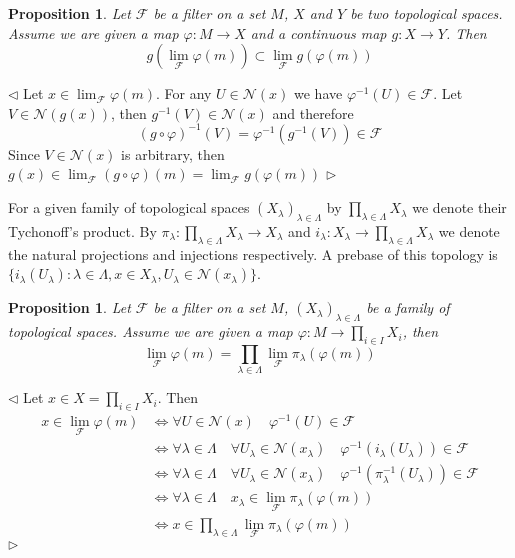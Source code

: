 \documentclass[12pt]{article}
\newtheorem{proposition}[theorem]{Proposition}
\newenvironment{proof}{\par $\triangleleft$}{$\triangleright$}
\begin{document}
\begin{proposition}\label{PrFiltersUnderContinuousFunctions} Let $\mathcal{F}$ be a filter on a set $M$, $X$ and $Y$ be two topological spaces. Assume we are given a map $\varphi:M\to X$ and a continuous map $g: X\to Y$. Then 
$$
g\left(\lim_{\mathcal{F}}\varphi(m)\right)\subset\lim_{\mathcal{F}}g(\varphi(m))
$$
\end{proposition}
\begin{proof} Let $x\in\lim_{\mathcal{F}}\varphi(m)$. For any $U\in\mathcal{N}(x)$ we have $\varphi^{-1}(U)\in\mathcal{F}$. Let $V\in\mathcal{N}(g(x))$, then $g^{-1}(V)\in\mathcal{N}(x)$ and therefore
$$
(g\circ\varphi)^{-1}(V)=\varphi^{-1}(g^{-1}(V))\in\mathcal{F}
$$
Since $V\in\mathcal{N}(x)$ is arbitrary, then $g(x)\in\lim_{\mathcal{F}}(g\circ\varphi)(m)=\lim_{\mathcal{F}}g(\varphi(m))$
\end{proof}

For a given family of topological spaces $(X_\lambda)_{\lambda\in \Lambda}$ by $\prod_{\lambda\in \Lambda}X_\lambda$ we denote their Tychonoff's product. By $\pi_\lambda:\prod_{\lambda\in \Lambda}X_\lambda\to X_\lambda$ and $i_\lambda:X_\lambda\to \prod_{\lambda\in \Lambda}X_\lambda$ we denote the natural projections and injections respectively. A prebase of this topology is $\{i_{\lambda}(U_\lambda):\lambda\in\Lambda, x\in X_\lambda, U_\lambda\in \mathcal{N}(x_\lambda)\}$.

\begin{proposition}\label{PrTopProdAndFilters}
Let $\mathcal{F}$ be a filter on a set $M$, $(X_\lambda)_{\lambda\in \Lambda}$ be a family of topological spaces. Assume we are given a map $\varphi:M\to \prod_{i\in I}X_i$, then
$$
\lim_{\mathcal{F}}\varphi(m)=\prod_{\lambda\in\Lambda}\lim_{\mathcal{F}}\pi_\lambda(\varphi(m))
$$
\end{proposition}
\begin{proof} Let $x\in X=\prod_{i\in I}X_i$. Then
$$
\begin{aligned}
x\in \lim_{\mathcal{F}}\varphi(m)
&\Longleftrightarrow
\forall U\in\mathcal{N}(x)\quad\varphi^{-1}(U)\in\mathcal{F}\\
&\Longleftrightarrow
\forall \lambda\in\Lambda\quad\forall U_\lambda\in\mathcal{N}(x_\lambda)\quad\varphi^{-1}(i_\lambda(U_\lambda))\in\mathcal{F}\\
&\Longleftrightarrow
\forall \lambda\in\Lambda\quad\forall U_\lambda\in\mathcal{N}(x_\lambda)\quad\varphi^{-1}(\pi^{-1}_\lambda(U_\lambda))\in\mathcal{F}\\
&\Longleftrightarrow
\forall \lambda\in\Lambda\quad x_\lambda\in\lim_{\mathcal{F}}\pi_\lambda(\varphi(m))\\
&\Longleftrightarrow
x\in\prod_{\lambda\in\Lambda}\lim_{\mathcal{F}}\pi_\lambda(\varphi(m))
\end{aligned}
$$
\end{proof}
\end{document}
